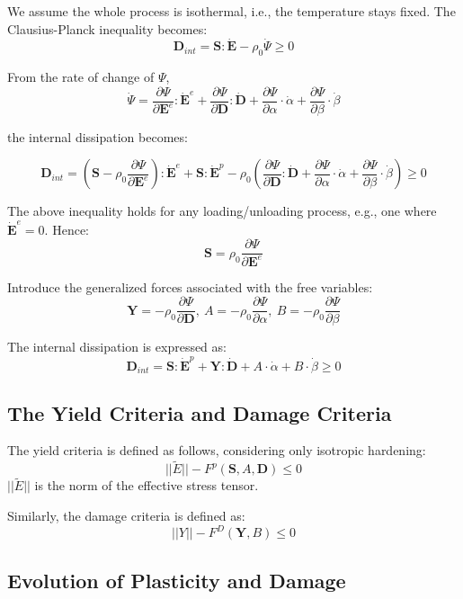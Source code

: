 \documentclass[11pt,fullpage]{article}
\begin{document}
We assume the whole process is isothermal, i.e., the temperature stays
fixed. The Clausius-Planck inequality becomes:
$$
\bm{D}_{int} = \bm{S}:\dot{\bm{E}} - \rho_0\dot{\Psi} \geq 0
$$

From the rate of change of $\Psi$,
$$
\dot{\Psi}=\frac{\partial\Psi}{\partial\bm{E}^e}:\dot{\bm{E}}^e+\frac{\partial\Psi}{\partial\bm{D}}:\dot{\bm{D}}
+\frac{\partial\Psi}{\partial\alpha}\cdot\dot{\alpha}+\frac{\partial\Psi}{\partial\beta}\cdot\dot{\beta}
$$

the internal dissipation becomes:

$$
\bm{D}_{int} = (\bm{S}-\rho_0\frac{\partial\Psi}{\partial\bm{E}^e}):\dot{\bm{E}}^e +\bm{S}:\dot{\bm{E}}^p- \rho_0(\frac{\partial\Psi}{\partial\bm{D}}:\dot{\bm{D}}
+\frac{\partial\Psi}{\partial\alpha}\cdot\dot{\alpha}+\frac{\partial\Psi}{\partial\beta}\cdot\dot{\beta}) \geq 0
$$

The above inequality holds for any loading/unloading process, e.g.,
one where $\dot{\bm{E}}^e=0$. Hence:
$$
\bm{S}=\rho_0\frac{\partial\Psi}{\partial\bm{E}^e}
$$

Introduce the generalized forces associated with the free variables:
$$
\bm{Y}=-\rho_0\frac{\partial\Psi}{\partial\bm{D}},\ A=-\rho_0\frac{\partial\Psi}{\partial\alpha},\ B=-\rho_0\frac{\partial\Psi}{\partial\beta} 
$$

The internal dissipation is expressed as:
$$
\bm{D}_{int} = \bm{S}:\dot{\bm{E}}^p+\bm{Y}:\dot{\bm{D}}+A\cdot\dot{\alpha}+B\cdot\dot{\beta}\geq 0
$$

\subsection{The Yield Criteria and Damage Criteria}

The yield criteria is defined as follows, considering only isotropic hardening:
$$
||\tilde{E}||-F^p(\bm{S},A,\bm{D})\leq 0
$$
$||\tilde{E}||$ is the norm of the effective stress tensor.

Similarly, the damage criteria is defined as:
$$
||Y||-F^D(\bm{Y},B)\leq 0
$$

\subsection{Evolution of Plasticity and Damage}



\end{document}
